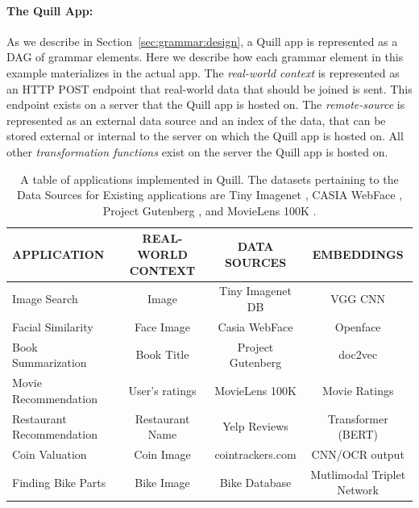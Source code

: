 \documentclass[11pt]{article}
\begin{document}
\paragraph{The Quill App:}
As we describe in Section~\ref{sec:grammar:design}, a Quill app is represented as a DAG of grammar elements. Here we describe how each grammar element in this example materializes in the actual app. The \emph{real-world context} is represented as an HTTP POST endpoint that real-world data that should be joined is sent. This endpoint exists on a server that the Quill app is hosted on.
The \emph{remote-source} is represented as an external data source and an index of the data, that can be stored external or internal to the server on which the Quill app is hosted on. All other \emph{transformation functions} exist on the server the Quill app is hosted on.

\begin{table}[t]
    \centering
\begin{tabular}{|l|c|c|c|}
\hline
\textbf{APPLICATION} & \textbf{REAL-WORLD CONTEXT} &  \textbf{DATA SOURCES} & \textbf{EMBEDDINGS} \\ \hline
Image Search & Image & Tiny Imagenet DB & VGG CNN \\ \hline
Facial Similarity & Face Image & Casia WebFace & Openface \\ \hline
Book Summarization & Book Title & Project Gutenberg & doc2vec \\ \hline
Movie Recommendation & User's ratings & MovieLens 100K & Movie Ratings \\ \hline
Restaurant Recommendation & Restaurant Name & Yelp Reviews & Transformer (BERT) \\ \hline
Coin Valuation & Coin Image & cointrackers.com & CNN/OCR output \\ \hline
Finding Bike Parts & Bike Image & Bike Database & Mutlimodal Triplet Network \\ \hline
\bottomrule
\end{tabular}
    \vspace{0.05cm}
    \caption{A table of applications implemented in Quill. The datasets pertaining to the Data Sources for Existing applications are Tiny Imagenet \cite{le2015tiny}, CASIA WebFace \cite{yi2014learning}, Project Gutenberg \cite{lahiri:2014:SRW}, and MovieLens 100K \cite{harper2015movielens}.}
    \label{table:applications}
\end{table}
\end{document}
